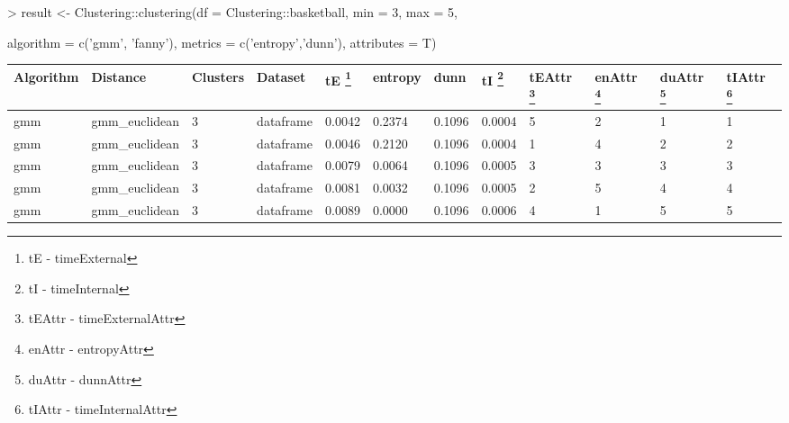 \begin{Schunk}
\begin{Sinput}
> result <- Clustering::clustering(df = Clustering::basketball, min = 3, max = 5,
\end{Sinput}
\begin{Sinput}
      algorithm = c('gmm', 'fanny'), metrics = c('entropy','dunn'), attributes = T)
\end{Sinput}
\end{Schunk}
{\small
\begin{longtable}{| p{1cm} | p{1.8cm} | p{0.7cm} | p{0.9cm} | p{0.5cm} | p{0.65cm} | p{0.5cm} | p{0.5cm} | p{0.55cm} | p{0.55cm} | p{0.6cm} | p{0.5cm} |}
\hline
\scriptsize  Algorithm & \scriptsize  Distance  &  \scriptsize Clusters & \scriptsize  Dataset & \scriptsize tE \footnote{tE - timeExternal}  & \scriptsize entropy & \scriptsize  dunn  & \scriptsize tI \footnote{tI - timeInternal} & \scriptsize tEAttr \footnote{tEAttr - timeExternalAttr} & \scriptsize enAttr \footnote{enAttr - entropyAttr} & \scriptsize duAttr \footnote{duAttr - dunnAttr}  & \scriptsize tIAttr \footnote{tIAttr - timeInternalAttr} \\
\hline
\scriptsize     gmm   & \scriptsize   gmm\_euclidean & \scriptsize    3    & \scriptsize dataframe & \scriptsize    0.0042  &  \scriptsize 0.2374  & \scriptsize 0.1096 & \scriptsize    0.0004  &  \scriptsize    5  & \scriptsize    2  & \scriptsize    1  & \scriptsize    1 \\
\scriptsize     gmm   & \scriptsize   gmm\_euclidean  & \scriptsize    3   &  \scriptsize dataframe  & \scriptsize    0.0046  &  \scriptsize 0.2120  & \scriptsize 0.1096 & \scriptsize    0.0004 &   \scriptsize    1  & \scriptsize    4 &  \scriptsize    2 &  \scriptsize    2 \\
\scriptsize     gmm   & \scriptsize   gmm\_euclidean & \scriptsize    3   &  \scriptsize dataframe & \scriptsize    0.0079  &  \scriptsize 0.0064  &\scriptsize 0.1096 & \scriptsize    0.0005 &   \scriptsize    3  &  \scriptsize    3  &  \scriptsize    3  & \scriptsize    3 \\
\scriptsize     gmm   & \scriptsize   gmm\_euclidean & \scriptsize    3 &  \scriptsize dataframe & \scriptsize    0.0081  &  \scriptsize 0.0032  & \scriptsize 0.1096 & \scriptsize    0.0005 &   \scriptsize    2  & \scriptsize    5  & \scriptsize    4  & \scriptsize    4 \\
\scriptsize     gmm   & \scriptsize   gmm\_euclidean & \scriptsize    3     & \scriptsize dataframe & \scriptsize    0.0089  &  \scriptsize 0.0000 &  \scriptsize 0.1096 & \scriptsize    0.0006 &   \scriptsize    4  & \scriptsize    1  & \scriptsize    5  & \scriptsize    5 \\

\end{longtable}}
